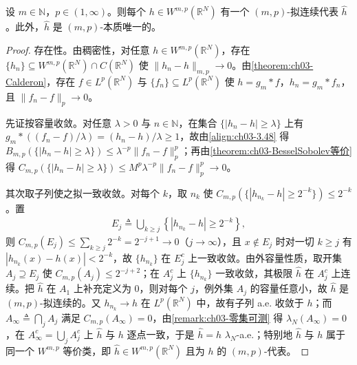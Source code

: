 \documentclass[../../main.tex]{subfiles}%
\begin{document}
\begin{theorem}\label{theorem:ch03-拟连续代表}
设 $m\in\mathbb{N}$，$p\in(1,\infty)$。则每个 $h\in W^{m,p}(\mathbb{R}^N)$ 有一个 $(m,p)$-拟连续代表 $\widehat h$。此外，$\widehat h$ 是 $(m,p)$-本质唯一的。
\end{theorem}

\begin{proof}
存在性。由稠密性，对任意 $h\in W^{m,p}(\mathbb{R}^N)$，存在 $\{h_n\}\subseteq W^{m,p}(\mathbb{R}^N)\cap C(\mathbb{R}^N)$ 使 $\|h_n-h\|_{m,p}\to0$。由\cref{theorem:ch03-Calderon}，存在 $f\in L^p(\mathbb{R}^N)$ 与 $\{f_n\}\subseteq L^p(\mathbb{R}^N)$ 使 $h=g_m*f$，$h_n=g_m*f_n$，且 $\|f_n-f\|_p\to0$。

先证按容量收敛。对任意 $\lambda>0$ 与 $n\in\mathbb{N}$，在集合 $\{|h_n-h|\geqslant\lambda\}$ 上有 $g_m*((f_n-f)/\lambda)=(h_n-h)/\lambda\geqslant1$，故由\eqref{align:ch03-3.48} 得 $B_{m,p}(\{|h_n-h|\geqslant\lambda\})\leqslant\lambda^{-p}\|f_n-f\|_p^p$；再由\cref{theorem:ch03-BesselSobolev等价} 得 $C_{m,p}(\{|h_n-h|\geqslant\lambda\})\leqslant M^{p}\lambda^{-p}\|f_n-f\|_p^p\to0$。

其次取子列使之拟一致收敛。对每个 $k$，取 $n_k$ 使 $C_{m,p}(\{|h_{n_k}-h|\geqslant2^{-k}\})\leqslant2^{-k}$。置
\begin{align*}
E_j\triangleq\bigcup_{k\geqslant j}\left\{|h_{n_k}-h|\geqslant2^{-k}\right\},
\end{align*}
则 $C_{m,p}(E_j)\leqslant\sum_{k\geqslant j}2^{-k}=2^{-j+1}\to0$（$j\to\infty$），且 $x\notin E_j$ 时对一切 $k\geqslant j$ 有 $|h_{n_k}(x)-h(x)|<2^{-k}$，故 $\{h_{n_k}\}$ 在 $E_j^c$ 上一致收敛。由外容量性质，取开集 $A_j\supseteq E_j$ 使 $C_{m,p}(A_j)\leqslant2^{-j+2}$；在 $A_j^c$ 上 $\{h_{n_k}\}$ 一致收敛，其极限 $\widehat h$ 在 $A_j^c$ 上连续。把 $\widehat h$ 在 $A_1$ 上补充定义为 $0$，则对每个 $j$，例外集 $A_j$ 的容量任意小，故 $\widehat h$ 是 $(m,p)$-拟连续的。又 $h_{n_k}\to h$ 在 $L^p(\mathbb{R}^N)$ 中，故有子列 a.e. 收敛于 $h$；而 $A_\infty\triangleq\bigcap_jA_j$ 满足 $C_{m,p}(A_\infty)=0$，由\cref{remark:ch03-零集可测} 得 $\lambda_N(A_\infty)=0$，在 $A_\infty^c=\bigcup_jA_j^c$ 上 $\widehat h$ 与 $h$ 逐点一致，于是 $\widehat h=h$ $\lambda_N$-a.e.；特别地 $\widehat h$ 与 $h$ 属于同一个 $W^{m,p}$ 等价类，即 $\widehat h\in W^{m,p}(\mathbb{R}^N)$ 且为 $h$ 的 $(m,p)$-代表。


\end{proof}
\end{document}
